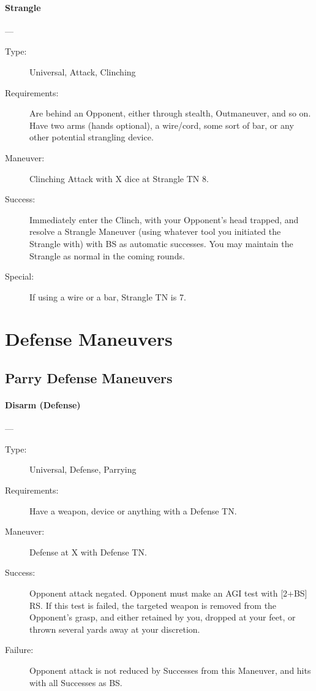 \documentclass[oneside,11pt,english]{book}
\begin{document}
\paragraph{\large\label{man:Strangle}Strangle}---\quad{\large[X]}
\vspace{-10pt}\begin{description} 
\item [Type:] Universal, Attack, Clinching 
\item [Requirements:] Are behind an Opponent, either through stealth, Outmaneuver, and so on. Have two arms 
  (hands optional), a wire/cord, some sort of bar, or any other potential strangling device. 
\item [Maneuver:] Clinching Attack with X dice at Strangle TN 8. 
\item [Success:] Immediately enter the Clinch, with your Opponent’s head trapped, and resolve a Strangle 
  Maneuver (using whatever tool you initiated the Strangle with) with BS as automatic successes. You may 
  maintain the Strangle as normal in the coming rounds. 
\item [Special:] If using a wire or a bar, Strangle TN is 7.
\end{description}

\section{Defense Maneuvers}
\subsection{Parry Defense Maneuvers}
\paragraph{\large\label{man:Disarm (Defense)}Disarm (Defense)}---\quad{\large[X+2]}
\vspace{-10pt}\begin{description} 
\item [Type:] Universal, Defense, Parrying
\item [Requirements:] Have a weapon, device or anything with a Defense TN. 
\item [Maneuver:] Defense at X with Defense TN. 
\item [Success:] Opponent attack negated. Opponent must make an AGI test with [2+BS] RS. If this test is failed, 
  the targeted weapon is removed from the Opponent's grasp, and either retained by you, dropped at your 
  feet, or thrown several yards away at your discretion. 
\item [Failure:] Opponent attack is not reduced by Successes from this Maneuver, and hits with all Successes as BS.
\end{description}
\end{document}
